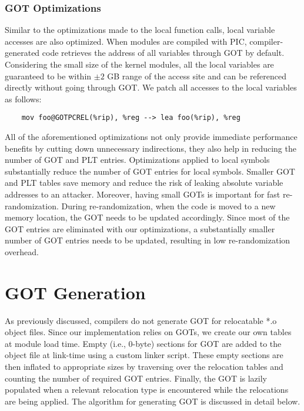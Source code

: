 \subsubsection*{GOT Optimizations}
Similar to the optimizations made to the local function calls, local variable accesses are also optimized. When modules are compiled with PIC, compiler-generated code retrieves the address of all variables through GOT by default. Considering the small size of the kernel modules, all the local variables are guaranteed to be within $\pm 2$ GB range of the access site and can be referenced directly without going through GOT. We patch all accesses to the local variables as follows:
\begin{verbatim}
    mov foo@GOTPCREL(%rip), %reg --> lea foo(%rip), %reg
\end{verbatim}

All of the aforementioned optimizations not only provide immediate performance benefits by cutting down unnecessary indirections, they also help in reducing the number of GOT and PLT entries. Optimizations applied to local symbols substantially reduce the number of GOT entries for local symbols. Smaller GOT and PLT tables save memory and reduce the risk of leaking absolute variable addresses to an attacker. Moreover, having small GOTs is important for fast re-randomization. During re-randomization, when the code is moved to a new memory location, the GOT needs to be updated accordingly. Since most of the GOT entries are eliminated with our optimizations, a substantially smaller number of GOT entries needs to be updated, resulting in low re-randomization overhead.

\section{GOT Generation}
\label{sec:pic:got}
As previously discussed, compilers do not generate GOT for relocatable *.o object files. Since our implementation relies on GOTs, we create our own tables at module load time. Empty (i.e., 0-byte) sections for GOT are added to the object file at link-time using a custom linker script. These empty sections are then inflated to appropriate sizes by traversing over the relocation tables and counting the number of required GOT entries. Finally, the GOT is lazily populated when a relevant relocation type is encountered while the relocations are being applied. The algorithm for generating GOT is discussed in detail below.

